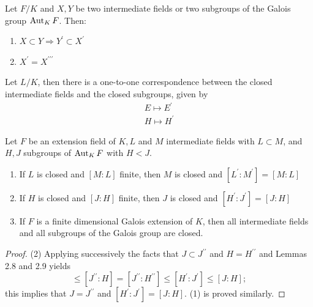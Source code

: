 \begin{lemma}
    Let $F/K$ and $X,Y$ be two intermediate fields or two subgroups of the Galois group $\operatorname{\operatorname{Aut}}_K F$. Then:
    \begin{enumerate}
        \item
              $X\subset Y \Rightarrow Y^\prime \subset X^\prime$
        \item
              $X^\prime=X^{\prime \prime \prime}$
    \end{enumerate}
\end{lemma}
\begin{lemma}
    Let $L/K$, then there is a one-to-one correspondence between the closed intermediate fields and the closed subgroups, given by
    \begin{equation*}
        \begin{aligned}
            E \mapsto E^\prime \\
            H \mapsto H^\prime
        \end{aligned}
    \end{equation*}
\end{lemma}
\begin{corollary}
    Let $F$ be an extension field of $ K , L$ and $M$ intermediate fields with $L \subset M$, and $H, {J}$ subgroups of $\operatorname{\operatorname{Aut}}_{ K } {F}$ with $H<{J}$.
    \begin{enumerate}
        \item
              If $L$ is closed and $[M: L]$ finite, then $M$ is closed and $\left[L^\prime: M^\prime\right]=[M: L]$

        \item
              If $H$ is closed and $[J: H]$ finite, then $J$ is closed and $\left[H^\prime: J^\prime\right]=[{J}: H]$
        \item
              If $F$ is a finite dimensional Galois extension of $K$, then all intermediate fields and all subgroups of the Galois group are closed.
    \end{enumerate}
    \begin{proof}
        (2) Applying successively the facts that $J \subset J^{\prime \prime}$ and $H=H^{\prime \prime}$ and Lemmas 2.8 and 2.9 yields
        \begin{equation*}
            [J: H] \leq\left[J^{\prime \prime}: H\right]=\left[J^{\prime \prime}: H^{\prime \prime}\right] \leq\left[H^{\prime}: J^{\prime}\right] \leq[J: H] ;
        \end{equation*}
        this implies that $J=J^{\prime \prime}$ and $\left[H^{\prime}: J^{\prime}\right]=[J: H]$. (1) is proved similarly.
    \end{proof}
\end{corollary}

